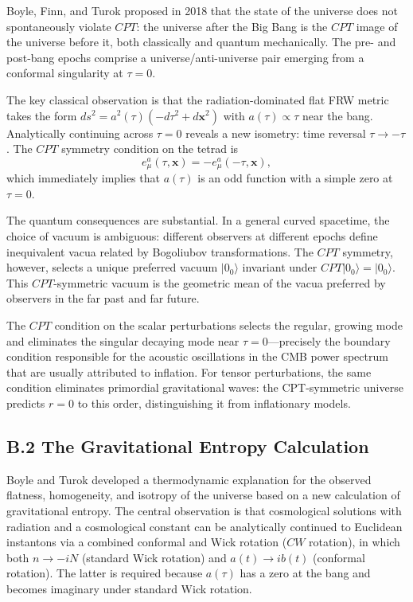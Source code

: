 \documentclass[12pt,a4paper]{article}
\theoremstyle{remark}
\begin{document}
Boyle, Finn, and Turok proposed in 2018 that the state of the universe does not spontaneously
violate $CPT$: the universe after the Big Bang is the $CPT$ image of the universe before it,
both classically and quantum mechanically. The pre- and post-bang epochs comprise a
universe/anti-universe pair emerging from a conformal singularity at $\tau = 0$.

The key classical observation is that the radiation-dominated flat FRW metric takes the form
$ds^2 = a^2(\tau)(-d\tau^2 + d\mathbf{x}^2)$ with $a(\tau) \propto \tau$ near the bang.
Analytically continuing across $\tau = 0$ reveals a new isometry: time reversal $\tau \to -\tau$.
The $CPT$ symmetry condition on the tetrad is
\begin{equation}
  e^a_\mu(\tau, \mathbf{x}) = -e^a_\mu(-\tau, \mathbf{x}),
\end{equation}
which immediately implies that $a(\tau)$ is an odd function with a simple zero at $\tau = 0$.

The quantum consequences are substantial. In a general curved spacetime, the choice of vacuum is
ambiguous: different observers at different epochs define inequivalent vacua related by Bogoliubov
transformations. The $CPT$ symmetry, however, selects a unique preferred vacuum $|0_0\rangle$
invariant under $CPT|0_0\rangle = |0_0\rangle$. This $CPT$-symmetric vacuum is the geometric
mean of the vacua preferred by observers in the far past and far future.

The $CPT$ condition on the scalar perturbations selects the regular, growing mode and eliminates
the singular decaying mode near $\tau = 0$---precisely the boundary condition responsible for
the acoustic oscillations in the CMB power spectrum that are usually attributed to inflation.
For tensor perturbations, the same condition eliminates primordial gravitational waves: the
CPT-symmetric universe predicts $r = 0$ to this order, distinguishing it from inflationary models.

\subsection*{B.2 The Gravitational Entropy Calculation}

Boyle and Turok developed a thermodynamic explanation for the observed flatness, homogeneity,
and isotropy of the universe based on a new calculation of gravitational entropy. The central
observation is that cosmological solutions with radiation and a cosmological constant can be
analytically continued to Euclidean instantons via a combined conformal and Wick rotation
($CW$ rotation), in which both $n \to -iN$ (standard Wick rotation) and $a(t) \to ib(t)$
(conformal rotation). The latter is required because $a(\tau)$ has a zero at the bang and
becomes imaginary under standard Wick rotation.
\end{document}
